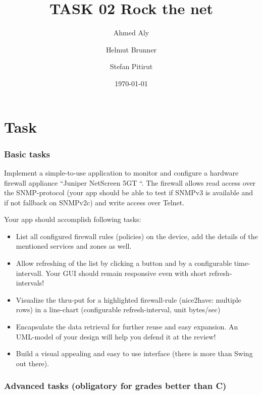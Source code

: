 \documentclass[a4paper,12pt]{scrreprt}
\begin{document}
 
\author{Ahmed Aly \and Helmut Brunner \and Stefan Pitirut } %
\title{TASK 02 Rock the net } %
\subject{SEW} %
\date{\today} %
\publishers{5AHITT} %

\maketitle
\tableofcontents


\chapter{Task}

\subsection{Basic tasks}

Implement a simple-to-use application to monitor and configure a hardware firewall appliance “Juniper NetScreen 5GT “. The firewall allows read access over the SNMP-protocol (your app should be able to test if SNMPv3 is available and if not fallback on SNMPv2c) and write access over Telnet.

Your app should accomplish following tasks:
\begin{itemize}

    \item List all configured firewall rules (policies) on the device, add the details of the mentioned services and zones as well.

    \item Allow refreshing of the list by clicking a button and by a configurable time-intervall. Your GUI should remain responsive even with short refresh-intervals!

    \item Visualize the thru-put for a highlighted firewall-rule (nice2have: multiple rows) in a line-chart (configurable refresh-interval, unit bytes/sec)

    \item Encapsulate the data retrieval for further reuse and easy expansion. An UML-model of your design will help you defend it at the review!

    \item Build a visual appealing and easy to use interface (there is more than Swing out there).
\end{itemize}
\subsection{Advanced tasks (obligatory for grades better than C)}
\end{document}
